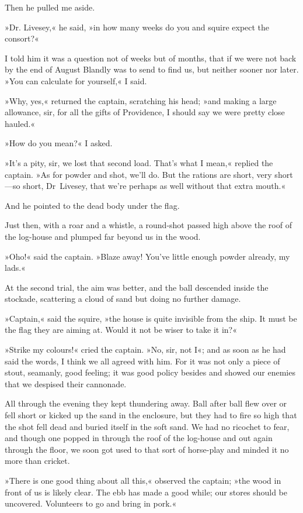Then he pulled me aside.

»Dr. Livesey,« he said, »in how many weeks do you and squire expect the consort?«

I told him it was a question not of weeks but of months, that if we were not back by the end of August Blandly was to send to find us, but neither sooner nor later. »You can calculate for yourself,« I said.

»Why, yes,« returned the captain, scratching his head; »and making a large allowance, sir, for all the gifts of Providence, I should say we were pretty close hauled.«

»How do you mean?« I asked.

»It's a pity, sir, we lost that second load. That's what I mean,« replied the captain. »As for powder and shot, we'll do. But the rations are short, very short—so short, Dr~Livesey, that we're perhaps as well without that extra mouth.«

And he pointed to the dead body under the flag.

Just then, with a roar and a whistle, a round-shot passed high above the roof of the log-house and plumped far beyond us in the wood.

»Oho!« said the captain. »Blaze away! You've little enough powder already, my lads.«

At the second trial, the aim was better, and the ball descended inside the stockade, scattering a cloud of sand but doing no further damage.

»Captain,« said the squire, »the house is quite invisible from the ship. It must be the flag they are aiming at. Would it not be wiser to take it in?«

»Strike my colours!« cried the captain. »No, sir, not I«; and as soon as he had said the words, I think we all agreed with him. For it was not only a piece of stout, seamanly, good feeling; it was good policy besides and showed our enemies that we despised their cannonade.

All through the evening they kept thundering away. Ball after ball flew over or fell short or kicked up the sand in the enclosure, but they had to fire so high that the shot fell dead and buried itself in the soft sand. We had no ricochet to fear, and though one popped in through the roof of the log-house and out again through the floor, we soon got used to that sort of horse-play and minded it no more than cricket.

»There is one good thing about all this,« observed the captain; »the wood in front of us is likely clear. The ebb has made a good while; our stores should be uncovered. Volunteers to go and bring in pork.«

